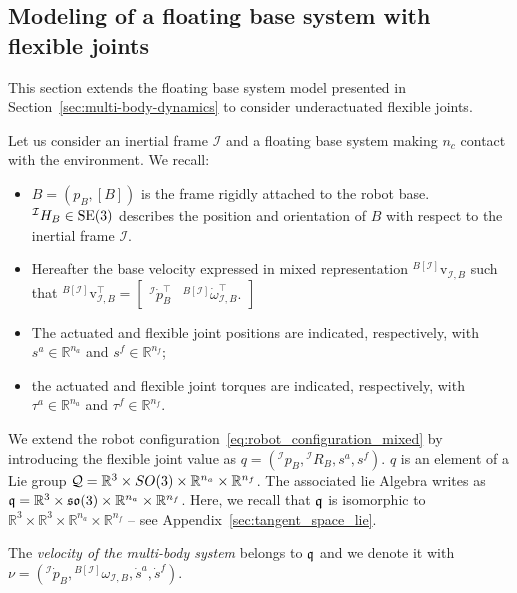 \subsection{Modeling of a floating base system with flexible joints}
This section extends the floating base system model presented in Section~\ref{sec:multi-body-dynamics} to consider underactuated flexible joints.
\par
Let us consider an inertial frame $\mathcal{I}$ and a floating base system making $n_c$ contact with the environment. We recall:
\begin{itemize}
    \item $B = (p_B, [B])$ is the frame rigidly attached to the robot base. ${}^\mathcal{I} H _B \in {\mathrm{SE}}(3)$  describes the position and orientation of $B$ with respect to the inertial frame $\mathcal{I}$.
    \item Hereafter the base velocity expressed in mixed representation ${}^{B[\mathcal{I}]}\mathrm{v}_{\mathcal{I}, B}$ such that  ${}^{B[\mathcal{I}]}\mathrm{v}_{\mathcal{I}, B}^\top = \begin{bmatrix}
    {}^{\mathcal{I}} \dot{p}_B^\top & {}^{B[\mathcal{I}]}\dot{\omega}_{\mathcal{I}, B}^\top.
    \end{bmatrix}$
    \item The actuated and flexible joint positions are indicated, respectively, with $s^a \in \mathbb{R}^{n_a}$ and $s^f \in \mathbb{R}^{n_f}$;
    \item the actuated and flexible joint torques are indicated, respectively, with $\tau^a \in \mathbb{R}^{n_a}$ and $\tau^f \in \mathbb{R}^{n_f}$.
\end{itemize}
We extend the robot configuration~\eqref{eq:robot_configuration_mixed} by introducing the flexible
joint value as $q = ({}^{\mathcal{I}} p_B, {}^{\mathcal{I}} R_{B}, s^a, s^f)$. $q$ is an element
of a Lie group $\mathcal{Q} = \mathbb{R}^3 \times SO{(3)} \times \mathbb{R}^{n_a} \times
\mathbb{R}^{n_f}$. The associated lie Algebra writes as $\mathfrak{q} = \mathbb{R}^3 \times \mathfrak{so}(3)
\times \mathbb{R}^{n_a} \times \mathbb{R}^{n_f}$. Here, we recall that $\mathfrak{q}$ is isomorphic to $\mathbb{R}^3 \times \mathbb{R}^3 \times \mathbb{R}^{n_a} \times \mathbb{R}^{n_f}$ -- see Appendix~\ref{sec:tangent_space_lie}.
\par
The \emph{velocity of the multi-body system} belongs to $\mathfrak{q}$ and we denote it with $\nu = \left({}^{\mathcal{I}} \dot{p}_B, {}^{B[\mathcal{I}]}{\omega}_{\mathcal{I}, B}, \dot{s}^a, \dot{s}^f\right)$.
\par
